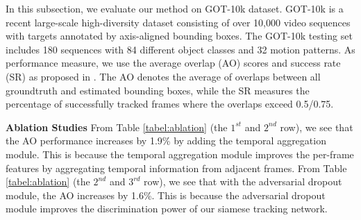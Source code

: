 In this subsection, we evaluate our method on GOT-10k \cite{Huang_2019} dataset.
GOT-10k is a recent large-scale high-diversity dataset consisting of over 10,000 video sequences with targets annotated by axis-aligned bounding boxes. 
The GOT-10k testing set includes 180 sequences with 84 different object classes and 32 motion patterns. As performance measure, we use the average overlap (AO) scores and success rate (SR) as proposed in \cite{Huang_2019}. The AO denotes the average of overlaps between all groundtruth and estimated bounding boxes, while the SR measures the percentage of successfully tracked frames where the overlaps exceed 0.5/0.75.

\textbf{Ablation Studies}
From Table \ref{tabel:ablation} (the $1^{st}$ and $2^{nd}$ row), we see that the AO performance increases by 1.9\% by adding the temporal aggregation module.
This is because the temporal aggregation module improves the per-frame features by aggregating temporal information from adjacent frames.
From Table \ref{tabel:ablation} (the $2^{nd}$ and $3^{rd}$ row), we see that with the adversarial dropout module, the AO increases by 1.6\%.
This is because the adversarial dropout module improves the discrimination power of our siamese tracking network.

